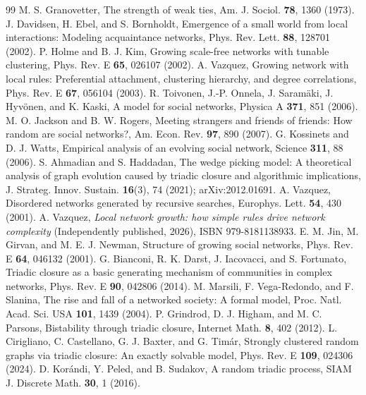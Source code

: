 \documentclass[aps,pre,twocolumn,superscriptaddress,floatfix,nofootinbib]{revtex4-2}
\begin{document}
\begin{thebibliography}{99}
 M. S. Granovetter, The strength of weak ties, Am. J. Sociol. \textbf{78}, 1360 (1973).
 J. Davidsen, H. Ebel, and S. Bornholdt, Emergence of a small world from local interactions: Modeling acquaintance networks, Phys. Rev. Lett. \textbf{88}, 128701 (2002).
 P. Holme and B. J. Kim, Growing scale-free networks with tunable clustering, Phys. Rev. E \textbf{65}, 026107 (2002).
 A. Vazquez, Growing network with local rules: Preferential attachment, clustering hierarchy, and degree correlations, Phys. Rev. E \textbf{67}, 056104 (2003).
 R. Toivonen, J.-P. Onnela, J. Saram\"aki, J. Hyv\"onen, and K. Kaski, A model for social networks, Physica A \textbf{371}, 851 (2006).
 M. O. Jackson and B. W. Rogers, Meeting strangers and friends of friends: How random are social networks?, Am. Econ. Rev. \textbf{97}, 890 (2007).
 G. Kossinets and D. J. Watts, Empirical analysis of an evolving social network, Science \textbf{311}, 88 (2006).
 S. Ahmadian and S. Haddadan, The wedge picking model: A theoretical analysis of graph evolution caused by triadic closure and algorithmic implications, J. Strateg. Innov. Sustain. \textbf{16}(3), 74 (2021); arXiv:2012.01691.
 A. Vazquez, Disordered networks generated by recursive searches, Europhys. Lett. \textbf{54}, 430 (2001).
 A. Vazquez, \emph{Local network growth: how simple rules drive network complexity} (Independently published, 2026), ISBN 979-8181138933.
 E. M. Jin, M. Girvan, and M. E. J. Newman, Structure of growing social networks, Phys. Rev. E \textbf{64}, 046132 (2001).
 G. Bianconi, R. K. Darst, J. Iacovacci, and S. Fortunato, Triadic closure as a basic generating mechanism of communities in complex networks, Phys. Rev. E \textbf{90}, 042806 (2014).
 M. Marsili, F. Vega-Redondo, and F. Slanina, The rise and fall of a networked society: A formal model, Proc. Natl. Acad. Sci. USA \textbf{101}, 1439 (2004).
 P. Grindrod, D. J. Higham, and M. C. Parsons, Bistability through triadic closure, Internet Math. \textbf{8}, 402 (2012).
 L. Cirigliano, C. Castellano, G. J. Baxter, and G. Tim\'ar, Strongly clustered random graphs via triadic closure: An exactly solvable model, Phys. Rev. E \textbf{109}, 024306 (2024).
 D. Kor\'andi, Y. Peled, and B. Sudakov, A random triadic process, SIAM J. Discrete Math. \textbf{30}, 1 (2016).

\end{thebibliography}
\end{document}
